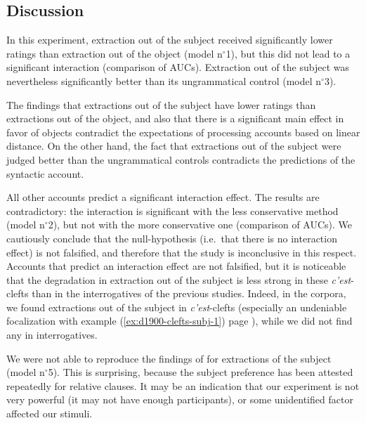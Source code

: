 

\subsection{Discussion}
\label{ch:exp14-discussion}

In this experiment, extraction out of the subject received significantly lower ratings than extraction out of the object (model n$^{\circ}$1), but this did not lead to a significant interaction (comparison of AUCs). Extraction out of the subject was nevertheless significantly better than its ungrammatical control (model n$^{\circ}$3). 

The findings that extractions out of the subject have lower ratings than extractions out of the object, and also that there is a significant main effect in favor of objects contradict the expectations of processing accounts based on linear distance. On the other hand, the fact that extractions out of the subject were judged better than the ungrammatical controls contradicts the predictions of the syntactic account. 

All other accounts predict a significant interaction effect. The results are contradictory: the interaction is significant with the less conservative method (model n$^{\circ}$2), but not with the more conservative one (comparison of AUCs). We cautiously conclude that the null-hypothesis (i.e.\ that there is no interaction effect) is not falsified, and therefore that the study is inconclusive in this respect. Accounts that predict an interaction effect are not falsified, but it is noticeable that the degradation in extraction out of the subject is less strong in these \emph{c'est}-clefts than in the interrogatives of the previous studies. Indeed, in the corpora, we found extractions out of the subject in \emph{c'est}-clefts (especially an undeniable focalization with example (\ref{ex:d1900-clefts-subj-1}) page \pageref{ex:d1900-clefts-subj-1}), while we did not find any in interrogatives.

We were not able to reproduce the findings of \citet{Destruel.2012} for extractions of the subject (model  n$^{\circ}$5). This is surprising, because the subject preference has been attested repeatedly for relative clauses. It may be an indication that our experiment is not very powerful (it may not have enough participants), or some unidentified factor affected our stimuli. 

